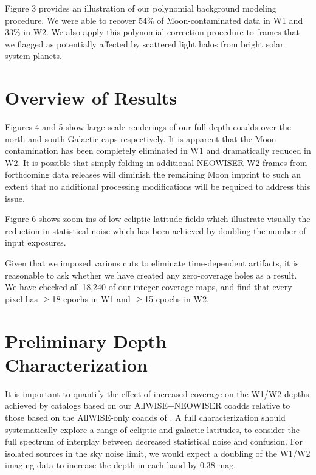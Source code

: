 \documentclass{emulateapj}
\begin{document}
Figure 3 provides an illustration of our polynomial background modeling
procedure. We were able to recover 54\% of Moon-contaminated data
in W1 and 33\% in W2. We also apply this polynomial
correction procedure to frames that we flagged as potentially affected
by scattered light halos from bright solar system planets.


\section{Overview of Results}
\label{sec:results}

Figures 4 and 5 show large-scale renderings of our full-depth coadds 
over the north and south Galactic caps respectively. It is 
apparent that the Moon contamination has been completely eliminated in
W1 and dramatically reduced in W2. It is possible that simply folding in 
additional NEOWISER W2 frames from forthcoming data releases will diminish the 
remaining Moon imprint to such an extent that no additional processing 
modifications will be required to address this issue.

Figure 6 shows zoom-ins of low ecliptic latitude fields which illustrate
visually the reduction in statistical noise which has been achieved
by doubling the number of input exposures.

Given that we imposed various cuts to eliminate time-dependent artifacts,
it is reasonable to ask whether we have created any zero-coverage holes
as a result. We have checked all 18,240 of our integer coverage maps, and find
that every pixel has $\ge$18 epochs in W1 and $\ge$15 epochs in W2.



\section{Preliminary Depth Characterization}
\label{sec:depth}

It is important to quantify the effect of increased coverage on
the W1/W2 depths achieved by catalogs based on our AllWISE+NEOWISER coadds 
relative to those based on the AllWISE-only coadds of \cite{lang14}. A
full characterization should systematically explore a range of 
ecliptic and galactic latitudes, to consider the full spectrum of interplay
between decreased statistical noise and confusion. For isolated sources in the 
sky noise limit, we would expect a doubling of the W1/W2 imaging data
to increase the depth in each band by 0.38 mag.
\end{document}
